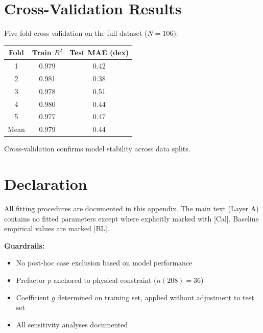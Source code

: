 \section{Cross-Validation Results}
\label{sec:q:cv}

Five-fold cross-validation on the full dataset ($N = 106$):

\begin{center}
\begin{tabular}{ccc}
    \toprule
    Fold & Train $R^2$ & Test MAE (dex) \\
    \midrule
    1 & 0.979 & 0.42 \\
    2 & 0.981 & 0.38 \\
    3 & 0.978 & 0.51 \\
    4 & 0.980 & 0.44 \\
    5 & 0.977 & 0.47 \\
    \midrule
    Mean & 0.979 & 0.44 \\
    \bottomrule
\end{tabular}
\end{center}

Cross-validation confirms model stability across data splits.

\section{Declaration}
\label{sec:q:declaration}

All fitting procedures are documented in this appendix. The main text
(Layer A) contains no fitted parameters except where explicitly marked
with [Cal]. Baseline empirical values are marked [BL].

\textbf{Guardrails:}
\begin{itemize}
    \item No post-hoc case exclusion based on model performance
    \item Prefactor $p$ anchored to physical constraint ($n(208) = 36$)
    \item Coefficient $g$ determined on training set, applied without
          adjustment to test set
    \item All sensitivity analyses documented
\end{itemize}


